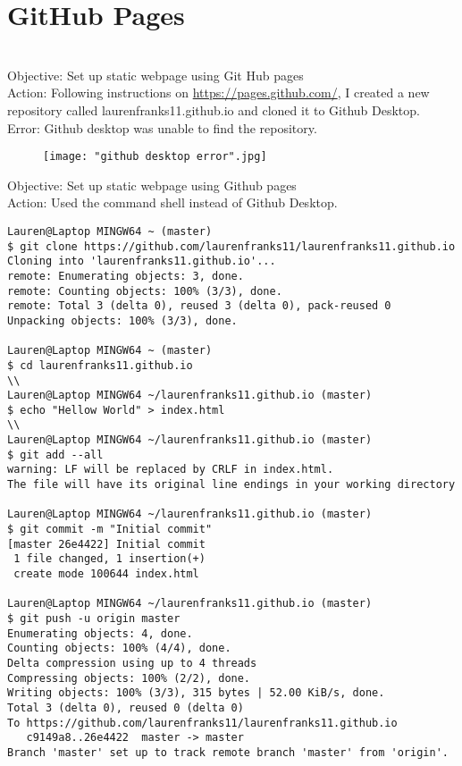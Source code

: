 \documentclass{article}
\begin{document}
\section{GitHub Pages}\\
Objective: Set up static webpage using Git Hub pages\\
Action: Following instructions on \href{https://pages.github.com/}{https://pages.github.com/}, I created a new repository called laurenfranks11.github.io and cloned it to Github Desktop.\\
Error: Github desktop was unable to find the repository.
\begin{figure}[htp]
    \centering
    \texttt{[image: "github desktop error".jpg]}
\end{figure}
\newpage
Objective: Set up static webpage using Github pages\\
Action: Used the command shell instead of Github Desktop.
\newline
\begin{verbatim}
Lauren@Laptop MINGW64 ~ (master)
$ git clone https://github.com/laurenfranks11/laurenfranks11.github.io
Cloning into 'laurenfranks11.github.io'...
remote: Enumerating objects: 3, done.
remote: Counting objects: 100% (3/3), done. 
remote: Total 3 (delta 0), reused 3 (delta 0), pack-reused 0 
Unpacking objects: 100% (3/3), done.

Lauren@Laptop MINGW64 ~ (master)
$ cd laurenfranks11.github.io
\\
Lauren@Laptop MINGW64 ~/laurenfranks11.github.io (master)
$ echo "Hellow World" > index.html
\\
Lauren@Laptop MINGW64 ~/laurenfranks11.github.io (master)
$ git add --all
warning: LF will be replaced by CRLF in index.html.
The file will have its original line endings in your working directory

Lauren@Laptop MINGW64 ~/laurenfranks11.github.io (master)
$ git commit -m "Initial commit"
[master 26e4422] Initial commit
 1 file changed, 1 insertion(+)
 create mode 100644 index.html

Lauren@Laptop MINGW64 ~/laurenfranks11.github.io (master)
$ git push -u origin master
Enumerating objects: 4, done.
Counting objects: 100% (4/4), done.
Delta compression using up to 4 threads
Compressing objects: 100% (2/2), done.
Writing objects: 100% (3/3), 315 bytes | 52.00 KiB/s, done.
Total 3 (delta 0), reused 0 (delta 0)
To https://github.com/laurenfranks11/laurenfranks11.github.io
   c9149a8..26e4422  master -> master
Branch 'master' set up to track remote branch 'master' from 'origin'.
\end{verbatim}
\end{document}
